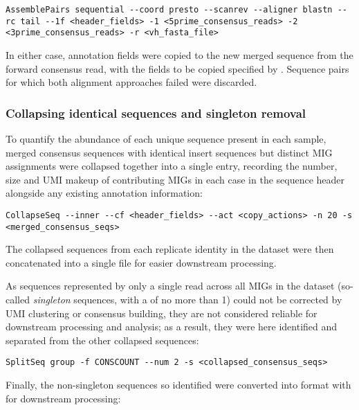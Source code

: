{\begin{lstlisting}
AssemblePairs sequential --coord presto --scanrev --aligner blastn --rc tail --1f <header_fields> -1 <5prime_consensus_reads> -2 <3prime_consensus_reads> -r <vh_fasta_file>
\end{lstlisting}

In either case, annotation fields were copied to the new merged sequence from the forward consensus read, with the fields to be copied specified by . Sequence pairs for which both alignment approaches failed were discarded.

\subsubsection{Collapsing identical sequences and singleton removal}
\label{sec:methods_comp_igpreproc_collapse}

To quantify the abundance of each unique sequence present in each sample, merged consensus sequences with identical insert sequences but distinct MIG assignments were collapsed together into a single  entry, recording the number, size and UMI makeup of contributing MIGs in each case in the sequence header alongside any existing annotation information:

\begin{lstlisting}
CollapseSeq --inner --cf <header_fields> --act <copy_actions> -n 20 -s <merged_consensus_seqs>
\end{lstlisting}

The collapsed sequences from each replicate identity in the dataset were then concatenated into a single file for easier downstream processing. 

As sequences represented by only a single read across all MIGs in the dataset (so-called \textit{singleton} sequences, with a  of no more than 1) could not be corrected by UMI clustering or consensus building, they are not considered reliable for downstream processing and analysis; as a result, they were here identified and separated from the other collapsed sequences:

\begin{lstlisting}
SplitSeq group -f CONSCOUNT --num 2 -s <collapsed_consensus_seqs>
\end{lstlisting}

Finally, the non-singleton sequences so identified were converted into  format with  \parencite{li2016seqtk} for downstream processing:

}
